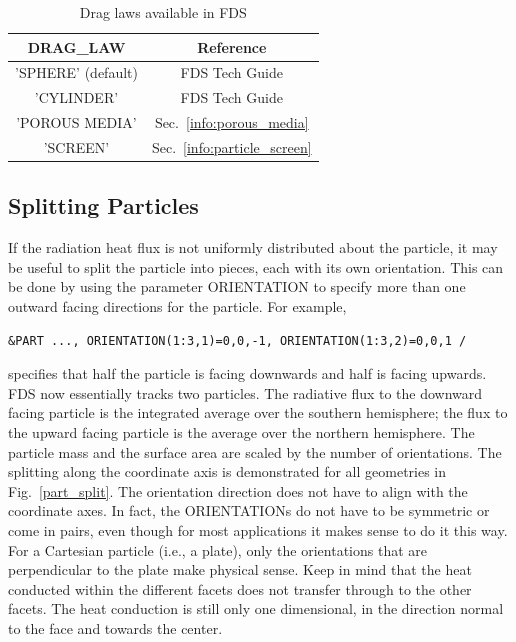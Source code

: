 \documentclass[11pt]{book}
\begin{document}
\vspace{\baselineskip}
\begin{table}[ht]
\begin{center}
\caption{Drag laws available in FDS}
\label{tbl:draglaws}
\begin{tabular}{|c|c|}
\hline
{\ct DRAG\_LAW}           & Reference   \\ \hline\hline
{\ct 'SPHERE'} (default)  & FDS Tech Guide \cite{FDS_Math_Guide}   \\ \hline
{\ct 'CYLINDER'}          & FDS Tech Guide \cite{FDS_Math_Guide}   \\ \hline
{\ct 'POROUS MEDIA'}      & Sec.~\ref{info:porous_media}           \\ \hline
{\ct 'SCREEN'}            & Sec.~\ref{info:particle_screen}        \\ \hline
\end{tabular}
\end{center}
\end{table}

\subsection{Splitting Particles}
\label{info:particle_split}

If the radiation heat flux is not uniformly distributed about the particle, it may be useful to split the particle into pieces, each with its own orientation. This can be done by using the parameter {\ct ORIENTATION} to specify  more than one outward facing directions for the particle. For example,
\begin{lstlisting}
&PART ..., ORIENTATION(1:3,1)=0,0,-1, ORIENTATION(1:3,2)=0,0,1 /
\end{lstlisting}
specifies that half the particle is facing downwards and half is facing upwards. FDS now essentially tracks two particles. The radiative flux to the downward facing particle is the integrated average over the southern hemisphere; the flux to the upward facing particle is the average over the northern hemisphere. The particle mass and the surface area are scaled by the number of orientations. The splitting along the coordinate axis is demonstrated for all geometries in Fig.~\ref{part_split}. The orientation direction does not have to align with the coordinate axes. In fact, the {\ct ORIENTATION}s do not have to be symmetric or come in pairs, even though for most applications it makes sense to do it this way. For a Cartesian particle (i.e., a plate), only the orientations that are perpendicular to the plate make physical sense. Keep in mind that the heat conducted within the different facets does not transfer through to the other facets. The heat conduction is still only one dimensional, in the direction normal to the face and towards the center.
\end{document}
